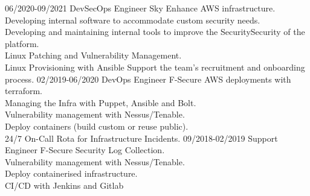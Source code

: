 \documentclass[]{twentysecondcv}
\begin{document}
\begin{twenty}
{  }
  \twentyitem
  {06/2020-09/2021}
  {DevSecOps Engineer}
  {Sky}
  {Enhance AWS infrastructure.\\
    Developing internal software to accommodate custom security needs.\\
    Developing and maintaining internal tools to improve the SecuritySecurity of the platform.\\
    Linux Patching and Vulnerability Management.\\
    Linux Provisioning with Ansible
    Support the team's recruitment and onboarding process.
  }
  \twentyitem
  {02/2019-06/2020}
  {DevOps Engineer}
  {F-Secure}
  {AWS deployments with terraform.\\
    Managing the Infra with Puppet, Ansible and Bolt.\\
    Vulnerability management with Nessus/Tenable.\\
    Deploy containers (build custom or reuse public).\\
    24/7 On-Call Rota for Infrastructure Incidents.
  }
  \twentyitem
  {09/2018-02/2019}
  {Support Engineer}
  {F-Secure}
  {Security Log Collection.\\
    Vulnerability management with Nessus/Tenable.\\
    Deploy containerised infrastructure.\\
    CI/CD with Jenkins and Gitlab
  }
\end{twenty}
\end{document}

